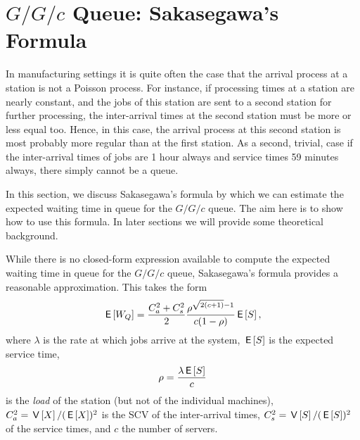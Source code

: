 \section{$G/G/c$ Queue: Sakasegawa's Formula}
\label{sec:gg1}


In manufacturing settings it is quite often the case that the arrival process at a station is not a Poisson process.
For instance, if processing times at a station are nearly constant, and the jobs of this station are sent to a second station for further processing, the inter-arrival times at the second station must be more or less equal too.
Hence, in this case, the arrival process at this  second station is most probably more regular than at the first station.
As a second, trivial, case if the inter-arrival times of jobs are 1 hour always and service times 59 minutes always, there simply cannot be a queue.

In this section, we discuss Sakasegawa's formula by which we can estimate the expected waiting time in queue for the $G/G/c$ queue.
The aim here is to show how to use this formula.
In later sections we will provide some theoretical background.




While there is no closed-form expression available to compute the expected waiting time in queue for the $G/G/c$ queue, Sakasegawa's formula provides a reasonable approximation. This takes the form
\begin{equation}\label{eq:7}
 \,\mathsf{E}\left[W_Q\right] = \frac{C_a^2+C_s^2}2 \frac{\rho^{\sqrt{2(c+1)}-1}}{c(1-\rho)} \,\mathsf{E}\left[S\right],
\end{equation}
where $\lambda$ is the rate at which jobs arrive at the system, $\,\mathsf{E}\left[S\right]$ is the expected service time, 
\begin{equation*}
 \rho = \frac{\lambda \,\mathsf{E}\left[S\right]}{c}
\end{equation*}
is the \emph{load} of the station (but not of the individual machines), $C_a^2 = \,\mathsf{V}\left[X\right]/(\,\mathsf{E}\left[X\right])^2$ is the SCV of the inter-arrival times, $C_s^2=\,\mathsf{V}\left[S\right]/(\,\mathsf{E}\left[S\right])^2$ of the service times, and $c$ the number of servers.



